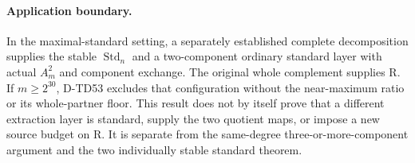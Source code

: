 \paragraph{Application boundary.}
In the maximal-standard setting, a separately established
complete decomposition supplies the stable \(\operatorname{Std}_n\)
and a two-component ordinary standard layer with actual
\(A_m^2\) and component exchange.  The original whole
complement supplies R.  If \(m\ge2^{30}\), D-TD53 excludes
that configuration without the near-maximum ratio or its
whole-partner floor.  This result does not by itself prove
that a different extraction layer is standard, supply the
two quotient maps, or impose a new source budget on R.
It is separate from the same-degree three-or-more-component
argument and the two individually stable standard theorem.
